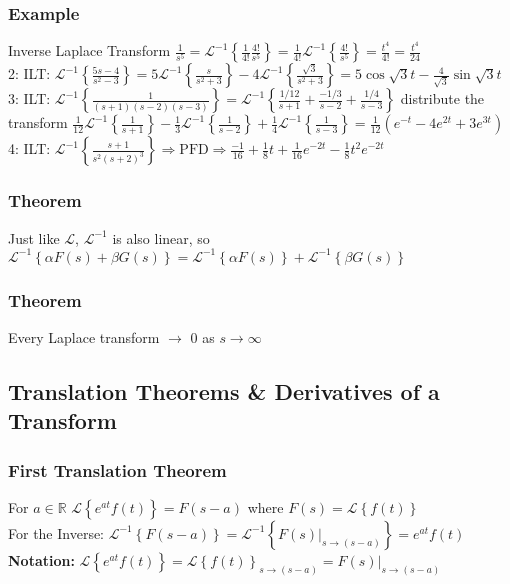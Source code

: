 \documentclass{article}
\begin{document}
\subsubsection{Example}
Inverse Laplace Transform $\frac{1}{s^5}=\mathcal{L}^{-1}\left\{\frac{1}{4!}\frac{4!}{s^5}\right\}=\frac{1}{4!}\mathcal{L}^{-1}\left\{\frac{4!}{s^5}\right\}=\frac{t^4}{4!}=\frac{t^4}{24}$
\\ 2: ILT: $\mathcal{L}^{-1}\left\{\frac{5s-4}{s^2-3}\right\}=5\mathcal{L}^{-1}\left\{\frac{s}{s^2+3}\right\}-4\mathcal{L}^{-1}\left\{\frac{\sqrt{3}}{s^2+3}\right\}=5\cos\sqrt{3}t-\frac{4}{\sqrt{3}}\sin\sqrt{3}t$
\\ 3: ILT: $\mathcal{L}^{-1}\left\{\frac{1}{(s+1)(s-2)(s-3)}\right\}=\mathcal{L}^{-1}\left\{\frac{1/12}{s+1}+\frac{-1/3}{s-2}+\frac{1/4}{s-3}\right\}$ distribute the transform $\frac{1}{12}\mathcal{L}^{-1}\left\{\frac{1}{s+1}\right\}-\frac{1}{3}\mathcal{L}^{-1}\left\{\frac{1}{s-2}\right\}+\frac{1}{4}\mathcal{L}^{-1}\left\{\frac{1}{s-3}\right\} = \frac{1}{12}\left(e^{-t}-4e^{2t}+3e^{3t}\right)$
\\ 4: ILT: $\mathcal{L}^{-1}\left\{\frac{s+1}{s^2(s+2)^3}\right\} \Rightarrow \text{PFD} \Rightarrow \frac{-1}{16}+\frac{1}{8}t+\frac{1}{16}e^{-2t}-\frac{1}{8}t^2e^{-2t}$
\subsubsection{Theorem}
Just like $\mathcal{L}$, $\mathcal{L}^{-1}$ is also linear, so $\mathcal{L}^{-1}\left\{\alpha F(s)+\beta G(s)\right\}=\mathcal{L}^{-1}\left\{\alpha F(s)\right\} + \mathcal{L}^{-1}\left\{\beta G(s)\right\}$
\subsubsection{Theorem}
Every Laplace transform $\to$ 0 as $s\to\infty$
\subsection{Translation Theorems \& Derivatives of a Transform}
\subsubsection{First Translation Theorem}
For $a \in \mathbb{R}$ $\mathcal{L}\left\{e^{at}f(t)\right\}=F(s-a)$ where $F(s)=\mathcal{L}\left\{f(t)\right\}$
\\For the Inverse: $\mathcal{L}^{-1}\left\{F(s-a)\right\}=\mathcal{L}^{-1}\left\{F(s)|_{s \to (s-a)}\right\}=e^{at}f(t)$
\\\textbf{Notation:} $\mathcal{L}\left\{e^{at}f(t)\right\}=\mathcal{L}\left\{f(t)\right\}_{s\to (s-a)} = F(s)|_{s\to (s-a)}$
\end{document}
